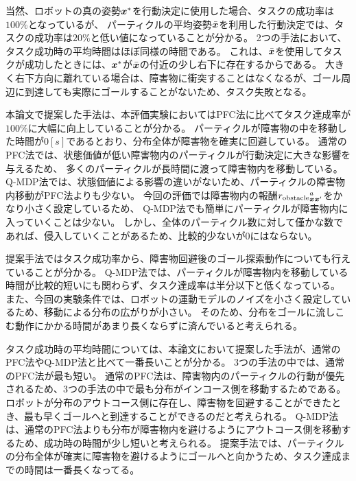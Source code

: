 当然、ロボットの真の姿勢$\boldsymbol{x}^{*}$を行動決定に使用した場合、タスクの成功率は$100\%$となっているが、
パーティクルの平均姿勢$\bar{\boldsymbol{x}}$を利用した行動決定では、タスクの成功率は$20\%$と低い値になっていることが分かる。
2つの手法において、タスク成功時の平均時間はほぼ同様の時間である。
これは、$\bar{\boldsymbol{x}}$を使用してタスクが成功したときには、$\boldsymbol{x}^{*}$が$\bar{\boldsymbol{x}}$の付近の少し右下に存在するからである。
大きく右下方向に離れている場合は、障害物に衝突することはなくなるが、ゴール周辺に到達しても実際にゴールすることがないため、タスク失敗となる。

本論文で提案した手法は、本評価実験においてはPFC法に比べてタスク達成率が$100\%$に大幅に向上していることが分かる。
パーティクルが障害物の中を移動した時間が$0[\si{s}]$であるとおり、分布全体が障害物を確実に回避している。
通常のPFC法では、状態価値が低い障害物内のパーティクルが行動決定に大きな影響を与えるため、
多くのパーティクルが長時間に渡って障害物内を移動している。
Q-MDP法では、状態価値による影響の違いがないため、パーティクルの障害物内移動がPFC法よりも少ない。
今回の評価では障害物内の報酬${r_{\rm obstacle}}^{a}_{\bm{x}\bm{x}^{\prime}}$をかなり小さく設定しているため、
Q-MDP法でも簡単にパーティクルが障害物内に入っていくことは少ない。
しかし、全体のパーティクル数に対して僅かな数であれば、侵入していくことがあるため、比較的少ないが$0$にはならない。

提案手法ではタスク成功率から、障害物回避後のゴール探索動作についても行えていることが分かる。
Q-MDP法では、パーティクルが障害物内を移動している時間が比較的短いにも関わらず、タスク達成率は半分以下と低くなっている。
また、今回の実験条件では、ロボットの運動モデルのノイズを小さく設定しているため、移動による分布の広がりが小さい。
そのため、分布をゴールに流しこむ動作にかかる時間があまり長くならずに済んでいると考えられる。

タスク成功時の平均時間については、本論文において提案した手法が、通常のPFC法やQ-MDP法と比べて一番長いことが分かる。
3つの手法の中では、通常のPFC法が最も短い。
通常のPFC法は、障害物内のパーティクルの行動が優先されるため、3つの手法の中で最も分布がインコース側を移動するためである。
ロボットが分布のアウトコース側に存在し、障害物を回避することができたとき、最も早くゴールへと到達することができるのだと考えられる。
Q-MDP法は、通常のPFC法よりも分布が障害物内を避けるようにアウトコース側を移動するため、成功時の時間が少し短いと考えられる。
提案手法では、パーティクルの分布全体が確実に障害物を避けるようにゴールへと向かうため、タスク達成までの時間は一番長くなってる。

